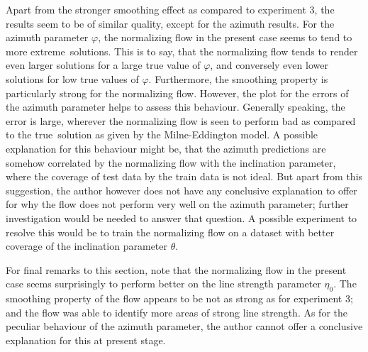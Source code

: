 \documentclass[a4paper,12pt]{report}
\begin{document}
Apart from the stronger smoothing effect as compared to experiment 3, the results seem to be of similar quality, except for the azimuth results. For the azimuth parameter $\varphi$, the normalizing flow in the present case seems to tend to more \flqq extreme\frqq\ solutions. This is to say, that the normalizing flow tends to render even larger solutions for a large true value of $\varphi$, and conversely even lower solutions for low true values of $\varphi$. Furthermore, the smoothing property is particularly strong for the normalizing flow. However, the plot for the errors of the azimuth parameter helps to assess this behaviour. Generally speaking, the error is large, wherever the normalizing flow is seen to perform bad as compared to the \flqq true\frqq\ solution as given by the Milne-Eddington model. A possible explanation for this behaviour might be, that the azimuth predictions are somehow correlated by the normalizing flow with the inclination parameter, where the coverage of test data by the train data is not ideal. But apart from this suggestion, the author however does not have any conclusive explanation to offer for why the flow does not perform very well on the azimuth parameter; further investigation would be needed to answer that question. A possible experiment to resolve this would be to train the normalizing flow on a dataset with better coverage of the inclination parameter $\theta$.

For final remarks to this section, note that the normalizing flow in the present case seems surprisingly to perform better on the line strength parameter $\eta_0$. The smoothing property of the flow appears to be not as strong as for experiment 3; and the flow was able to identify more areas of strong line strength. As for the peculiar behaviour of the azimuth parameter, the author cannot offer a conclusive explanation for this at present stage.
\end{document}
